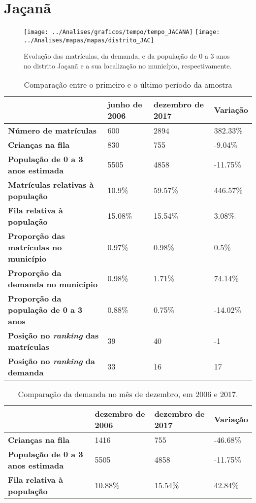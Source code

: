 \section{Jaçanã}
\begin{figure}[H]
\centering
\texttt{[image: ../Analises/graficos/tempo/tempo\_JACANA]}
\texttt{[image: ../Analises/mapas/mapas/distrito\_JAC]}
\caption{Evolução das matrículas, da demanda, e da população de 0 a 3 anos no distrito Jaçanã e a sua localização no município, respectivamente.}
\end{figure}
\begin{table}[H]
\begin{tabular}{l|l|l|l}
\textbf{}                                      & \textbf{junho de 2006}       & \textbf{dezembro de 2017}    & \textbf{Variação} \\ \hline
\textbf{Número de matrículas}                  & 600 & 2894 & 382.33\% \\ \hline
\textbf{Crianças na fila}                      & 830 & 755 & -9.04\% \\ \hline
\textbf{População de 0 a 3 anos estimada}      & 5505 & 4858 & -11.75\% \\ \hline
\textbf{Matrículas relativas à população}      & 10.9\% & 59.57\% & 446.57\% \\ \hline
\textbf{Fila relativa à população}             & 15.08\% & 15.54\% & 3.08\% \\ \hline
\textbf{Proporção das matrículas no município} & 0.97\% & 0.98\% & 0.5\% \\ \hline
\textbf{Proporção da demanda no município}     & 0.98\% & 1.71\% & 74.14\% \\ \hline
\textbf{Proporção da população de 0 a 3 anos}  & 0.88\% & 0.75\% & -14.02\% \\ \hline
\textbf{Posição no \textit{ranking} das matrículas}     & 39 & 40 & -1 \\ \hline
\textbf{Posição no \textit{ranking} da demanda}         & 33 & 16 & 17 \\ 
\end{tabular}
\caption{Comparação entre o primeiro e o último período da amostra}
\end{table}
\begin{table}[H]
\begin{tabular}{l|l|l|l}
\textbf{}                                 & \textbf{dezembro de 2006} & \textbf{dezembro de 2017} & \textbf{Variação} \\ \hline
\textbf{Crianças na fila}                      & 1416 & 755 & -46.68\% \\ \hline
\textbf{População de 0 a 3 anos estimada}      & 5505 & 4858 & -11.75\% \\ \hline
\textbf{Fila relativa à população}             & 10.88\% & 15.54\% & 42.84\% \\
\end{tabular}
\caption{Comparação da demanda no mês de dezembro, em 2006 e 2017.}
\end{table}

